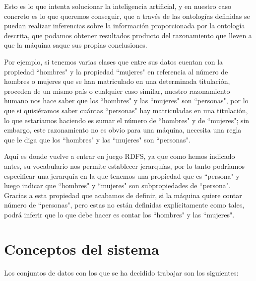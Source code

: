 \bigskip
Esto es lo que intenta solucionar la inteligencia artificial, y en nuestro caso concreto es lo que queremos conseguir, que a través de las ontologías definidas se puedan realizar inferencias sobre la información proporcionada por la ontología descrita, que podamos obtener resultados producto del razonamiento que lleven a que la máquina saque sus propias conclusiones.

\bigskip
Por ejemplo, si tenemos varias clases que entre sus datos cuentan con la propiedad ``hombres" y la propiedad ``mujeres" en referencia al número de hombres o mujeres que se han matriculado en una determinada titulación, proceden de un mismo país o cualquier caso similar, nuestro razonamiento humano nos hace saber que los ``hombres" y las ``mujeres" son ``personas", por lo que si quisiéramos saber cuántas ``personas" hay matriculadas en una titulación, lo que estaríamos haciendo es sumar el número de ``hombres" y de ``mujeres"; sin embargo, este razonamiento no es obvio para una máquina, necesita una regla que le diga que los ``hombres" y las ``mujeres" son ``personas".

\bigskip
Aquí es donde vuelve a entrar en juego RDFS, ya que como hemos indicado antes, su vocabulario nos permite establecer jerarquías, por lo tanto podríamos especificar una jerarquía en la que tenemos una propiedad que es ``persona" y luego indicar que ``hombres" y ``mujeres" son subpropiedades de ``persona". Gracias a esta propiedad que acabamos de definir, si la máquina quiere contar número de ``personas", pero estas no están definidas explícitamente como tales, podrá inferir que lo que debe hacer es contar los ``hombres" y las ``mujeres".

\section{Conceptos del sistema}

Los conjuntos de datos con los que se ha decidido trabajar son los siguientes:

